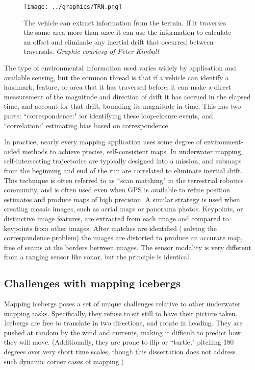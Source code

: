 \begin{figure}[htbp]
   \centering
   \texttt{[image: ../graphics/TRN.png]} %
   \caption{The vehicle can extract information from the terrain. If it traverses the same area more than once it can use the information to calculate an offset and eliminate any inertial drift that occurred between traversals. \emph{Graphic courtesy of Peter Kimball}}
   \label{fig:TRN}
\end{figure}

The type of environmental information used varies widely by application and available sensing, but the common thread is that if a vehicle can identify a landmark, feature, or area that it has traversed before, it can make a direct measurement of the magnitude and direction of drift it has accrued in the elapsed time, and account for that drift, bounding its magnitude in time. This has two parts: ``correspondence:" ior identifying these loop-closure events, and ``correlation:" estimating bias based on correspondence. 

In practice, nearly every mapping application uses some degree of environment-aided methods to achieve precise, self-consistent maps. In underwater mapping, self-intersecting trajectories are typically designed into a mission, and submaps from the beginning and end of the run are correlated to eliminate inertial drift. This technique is often referred to as ``scan matching" in the terrestrial robotics community, and is often used even when GPS is available to refine position estimates and produce maps of high precision. A similar strategy is used when creating mosaic images, such as aerial maps or panorama photos.  Keypoints, or distinctive image features, are extracted from each image and compared to keypoints from other images. After matches are identified ( solving the correspondence problem) the images are distorted to produce an accurate map, free of seams at the borders between images. The sensor modality is very different from a ranging sensor like sonar, but the principle is identical.

\subsection{Challenges with mapping icebergs}

Mapping icebergs poses a set of unique challenges relative to other underwater mapping tasks. Specifically, they refuse to sit still to have their picture taken. Icebergs are free to translate in two directions, and rotate in heading. They are pushed at random by the wind  and currents, making it difficult to predict how they will move. (Additionally, they are prone to flip or ``turtle," pitching 180 degrees over very short time scales, though this dissertation does not address such dynamic corner cases of mapping.) 

